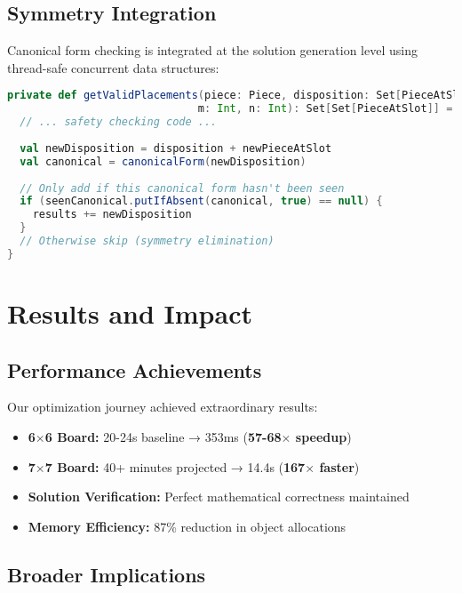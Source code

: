 \documentclass[12pt,a4paper]{article}
\theoremstyle{definition}
\begin{document}
\subsection{Symmetry Integration}

Canonical form checking is integrated at the solution generation level using thread-safe concurrent data structures:

\begin{lstlisting}[language=Scala, caption=Symmetry-Aware Placement]
private def getValidPlacements(piece: Piece, disposition: Set[PieceAtSlot], 
                              m: Int, n: Int): Set[Set[PieceAtSlot]] = {
  // ... safety checking code ...
  
  val newDisposition = disposition + newPieceAtSlot
  val canonical = canonicalForm(newDisposition)
  
  // Only add if this canonical form hasn't been seen
  if (seenCanonical.putIfAbsent(canonical, true) == null) {
    results += newDisposition
  }
  // Otherwise skip (symmetry elimination)
}
\end{lstlisting}

\section{Results and Impact}

\subsection{Performance Achievements}

Our optimization journey achieved extraordinary results:

\begin{itemize}
\item \textbf{6$\times$6 Board:} 20-24s baseline → 353ms (\textbf{57-68$\times$ speedup})
\item \textbf{7$\times$7 Board:} 40+ minutes projected → 14.4s (\textbf{167$\times$ faster})
\item \textbf{Solution Verification:} Perfect mathematical correctness maintained
\item \textbf{Memory Efficiency:} 87\% reduction in object allocations
\end{itemize}

\subsection{Broader Implications}
\end{document}

